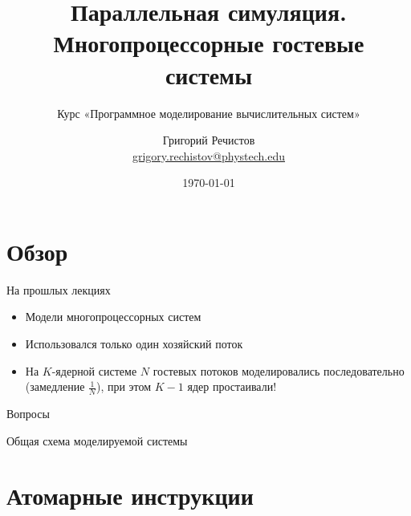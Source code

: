 \documentclass{beamer}
\title{Параллельная симуляция. Многопроцессорные гостевые системы}
\subtitle{Курс «Программное моделирование вычислительных систем»}
\author[]{Григорий Речистов \\ \small{\href{mailto:grigory.rechistov@phystech.edu}{grigory.rechistov@phystech.edu}}}
\date{\today}
\begin{document}
\begin{frame}
\titlepage
\end{frame}

\begin{frame}
\tableofcontents
\end{frame} 

\section{Обзор}

\begin{frame}{На прошлых лекциях}
\begin{itemize}
    \item Модели многопроцессорных систем
    \item Использовался только один хозяйский поток
    \item На $K$-ядерной системе $N$ гостевых потоков моделировались последовательно (замедление $\frac{1}{N}$), при этом $K-1$ ядер простаивали!
\end{itemize}
\end{frame}

\begin{frame}{Вопросы}
    
\end{frame}

\begin{frame}{Общая схема моделируемой системы}

\centering


    
\end{frame}


\section{Атомарные инструкции}
\end{document}
